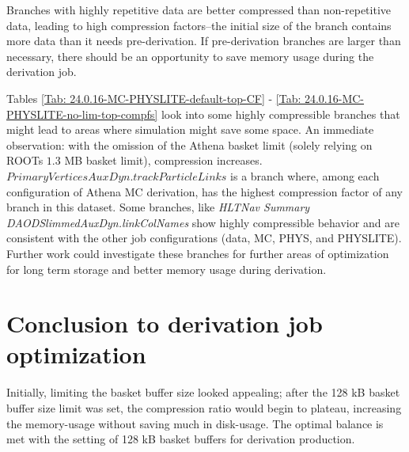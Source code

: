 Branches with highly repetitive data are better compressed than non-repetitive data, leading to high compression factors--the initial size of the branch contains more data than it needs pre-derivation. 
If pre-derivation branches are larger than necessary, there should be an opportunity to save memory usage during the derivation job. 

Tables \ref{Tab: 24.0.16-MC-PHYSLITE-default-top-CF} - \ref{Tab: 24.0.16-MC-PHYSLITE-no-lim-top-compfs} look into some highly compressible branches that might lead to areas where simulation might save some space. 
An immediate observation: with the omission of the Athena basket limit (solely relying on ROOTs $1.3$ MB basket limit), compression increases.   
$\textit{PrimaryVerticesAuxDyn.trackParticleLinks}$ is a branch where, among each configuration of Athena MC derivation, has the highest compression factor of any branch in this dataset. 
Some branches, like \textit{HLTNav Summary DAODSlimmedAuxDyn.linkColNames} show highly compressible behavior and are consistent with the other job configurations (data, MC, PHYS, and PHYSLITE). 
Further work could investigate these branches for further areas of optimization for long term storage and better memory usage during derivation.
\vspace{10px}




\pagebreak
\section{Conclusion to derivation job optimization}
\label{sec:DAODProd_Results_conclusion}

Initially, limiting the basket buffer size looked appealing; after the 128 kB basket buffer size limit was set, the compression ratio would begin to plateau, increasing the memory-usage without saving much in disk-usage. 
The optimal balance is met with the setting of 128 kB basket buffers for derivation production. 

